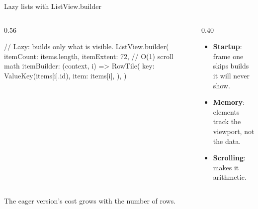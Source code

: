 \documentclass[10pt,aspectratio=169,t]{beamer}
\begin{document}
\begin{frame}[fragile,eyebrow=Optimization]{Lazy lists with ListView.builder}
  \begin{columns}[T]
    \begin{column}{0.56\textwidth}
\begin{dart}
// Lazy: builds only what is visible.
ListView.builder(
  itemCount: items.length,
  itemExtent: 72,      // O(1) scroll math
  itemBuilder: (context, i) => RowTile(
    key: ValueKey(items[i].id),
    item: items[i],
  ),
)
\end{dart}
    \end{column}
    \begin{column}{0.40\textwidth}
      \begin{itemize}
        \item \textbf{Startup}: frame one skips builds it will never show.
        \item \textbf{Memory}: elements track the viewport, not the data.
        \item \textbf{Scrolling}:  makes it arithmetic.
      \end{itemize}
    \end{column}
  \end{columns}
  \begin{takeaway}{The eager version's cost grows with the number of rows.}
  \end{takeaway}
\end{frame}
\end{document}

